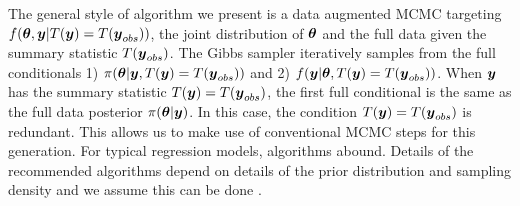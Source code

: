 \documentclass[ba]{imsart}
\def\bth{\mbox{\boldmath $\theta$}}
\def\bbeta{\mbox{\boldmath $\beta$}}
\newcommand{\by}{\mbox{\boldmath $y$}}
\newcommand{\green}[1]{{\color{green}#1}}
\begin{document}
The general style of algorithm we present is a data augmented
MCMC targeting $f(\bth, \by |
T(\by)=T(\by_{obs}))$, the joint distribution of $\bth$ and the full
data given the summary statistic $T(\by_{obs})$. 
 The Gibbs sampler \citep{gelfand1990} iteratively samples from the
 full conditionals 1) $\pi(\bth|\by, T(\by)=T(\by_{obs}))$ and 2) $f(\by|\bth, T(\by)=T(\by_{obs}))$.  When $\by$ has the summary statistic $T(\by) = T(\by_{obs})$,
the first full conditional is the same as the full data posterior $\pi(\bth|\by)$. In this case, the condition $T(\by) = T(\by_{obs})$ is redundant.  This allows us to make use of conventional MCMC steps for this generation.  For typical regression models, algorithms abound. Details of the recommended algorithms depend on details of
the prior distribution and sampling density and we assume this can be done \citep[see e.g.,][]{liu1994, liang2008}.  


\end{document}
